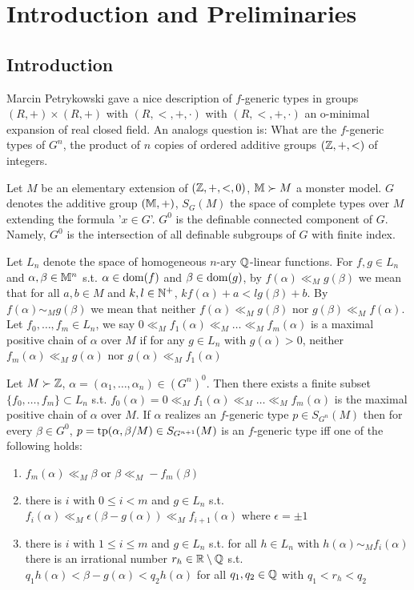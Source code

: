\documentclass[11pt]{article}
\begin{document}
\section{Introduction and Preliminaries}
\label{sec:org278c7a9}
\subsection{Introduction}
\label{sec:orgee248e1}
Marcin Petrykowski gave a nice description of \(f\)-generic types in groups \((R,+)\times(R,+)\)
with \((R,<,+,\cdot)\) with \((R,<,+,\cdot)\) an o-minimal expansion of real closed field. An analogs
question is: What are the \(f\)-generic types of \(G^n\), the product of \(n\) copies of ordered
additive groups \((\mathbb{Z},+,<)\) of integers.

Let \(M\) be an elementary extension of \((\mathbb{Z},+,<,0)\), \(\mathbb{M}\succ M\) a monster model. \(G\) denotes
the additive group \((\mathbb{M},+)\), \(S_G(M)\) the space of complete types over \(M\) extending the
formula '\(x\in G\)'. \(G^0\) is the definable connected component of \(G\). Namely, \(G^0\) is the
intersection of all definable subgroups of \(G\) with finite index.

Let \(L_n\) denote the space of homogeneous \(n\)-ary \(\mathbb{Q}\)-linear functions. For \(f,g\in L_n\)
and \(\alpha,\beta\in\mathbb{M}^n\) s.t. \(\alpha\in\operatorname{dom}(f)\) and \(\beta\in\operatorname{dom}(g)\), by \(f(\alpha)\ll_Mg(\beta)\) we mean that for
all \(a,b\in M\) and \(k,l\in\mathbb{N}^+\), \(kf(\alpha)+a<lg(\beta)+b\). By \(f(\alpha)\sim_Mg(\beta)\) we mean that
neither \(f(\alpha)\ll_Mg(\beta)\) nor \(g(\beta)\ll_Mf(\alpha)\). Let \(f_0,\dots,f_m\in L_n\), we
say \(0\ll_Mf_1(\alpha)\ll_M\dots\ll_Mf_m(\alpha)\) is a maximal positive chain of \(\alpha\) over \(M\) if for any \(g\in L_n\)
with \(g(\alpha)>0\), neither \(f_m(\alpha)\ll_Mg(\alpha)\) nor \(g(\alpha)\ll_Mf_1(\alpha)\)

\begin{theorem}[]
Let \(M\succ\mathbb{Z}\), \(\alpha=(\alpha_1,\dots,\alpha_n)\in(G^n)^0\). Then there exists a finite subset \(\{f_0,\dots,f_m\}\subset L_n\)
s.t. \(f_0(\alpha)=0\ll_Mf_1(\alpha)\ll_M\dots\ll_Mf_m(\alpha)\) is the maximal positive chain of \(\alpha\) over \(M\). If \(\alpha\)
realizes an \(f\)-generic type \(p\in S_{G^n}(M)\) then for
every \(\beta\in G^0\), \(p=\operatorname{tp}(\alpha,\beta/M)\in S_{G^{n+1}}(M)\) is an \(f\)-generic type iff one of the
following holds:
\begin{enumerate}
\item \(f_m(\alpha)\ll_M\beta\) or \(\beta\ll_M-f_m(\beta)\)
\item there is \(i\) with \(0\le i<m\) and \(g\in L_n\) s.t. \(f_i(\alpha)\ll_M\epsilon(\beta-g(\alpha))\ll_Mf_{i+1}(\alpha)\)
where \(\epsilon=\pm 1\)
\item there is \(i\) with \(1\le i\le m\) and \(g\in L_n\) s.t. for all \(h\in L_n\) with \(h(\alpha)\sim_Mf_i(\alpha)\)
there is an irrational number \(r_h\in\mathbb{R}\setminus\mathbb{Q}\) s.t. \(q_1h(\alpha)<\beta-g(\alpha)<q_2h(\alpha)\) for all \(q_1,q_2\in\mathbb{Q}\)
with \(q_1<r_h<q_2\)
\end{enumerate}
\end{theorem}
\end{document}
